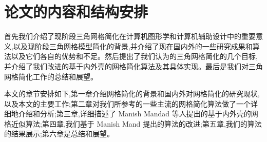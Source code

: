 

\section{论文的内容和结构安排}
首先我们介绍了现阶段三角网格简化在计算机图形学和计算机辅助设计中的重要意义,以及现阶段三角网格模型简化的背景,并介绍了现在国内外的一些研究成果和算法以及它们各自的优势和不足。然后提出了我们认为的三角网格简化的几个目标,并介绍了我们改进的基于内外壳的网格简化算法及其具体实现。最后是我们对三角网格简化工作的总结和展望。\par
本文的章节安排如下,第一章介绍网格简化的背景和国内外对网格简化的研究现状,以及本文的主要工作;第二章对我们所参考的一些主流的网格简化算法做了一个详细地介绍和分析;第三章,详细描述了 Manish Mandad 等人提出的基于内外壳的网格近似算法;第四章,我们基于 Manish Mand 提出的算法的改进;第五章,我们的算法的结果展示;第六章是总结和展望。
